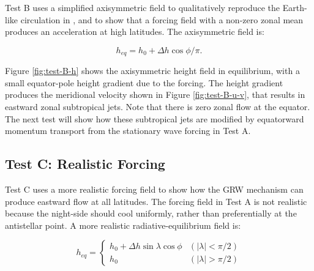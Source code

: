 Test B uses a simplified axisymmetric field to qualitatively reproduce the Earth-like circulation in \citet{shell2004superrotation}, and to show that a forcing field with a non-zero zonal mean produces an acceleration at high latitudes. The axisymmetric field is:

\begin{equation}
  h_{eq} = h_{0} + \Delta h \cos\phi / \pi.
\end{equation}

Figure \ref{fig:test-B-h} shows the axisymmetric height field in equilibrium, with a small equator-pole height gradient due to the forcing. The height gradient produces the meridional velocity shown in Figure \ref{fig:test-B-u-v}, that results in eastward zonal subtropical jets. Note that there is zero zonal flow at the equator. The next test will show how these subtropical jets are modified by equatorward momentum transport from the stationary wave forcing in Test A.




\subsection{Test C: Realistic Forcing}

Test C uses a more realistic forcing field to show how the GRW mechanism can produce eastward flow at all latitudes. The forcing field in Test A is not realistic because the night-side should cool uniformly, rather than preferentially at the antistellar point. A more realistic radiative-equilibrium field is:

\begin{equation}
  h_{eq}=\begin{cases}
  h_{0} + \Delta h \sin \lambda \cos\phi & ( |\lambda | < \pi / 2 ) \\
  h_{0} & ( |\lambda | > \pi / 2 )
\end{cases}
\end{equation}



